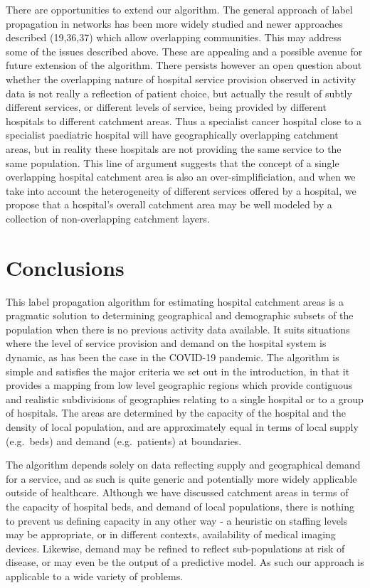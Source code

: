 \documentclass[
]{article}
\begin{document}
There are opportunities to extend our algorithm. The general approach of
label propagation in networks has been more widely studied and newer
approaches described (19,36,37) which allow overlapping communities.
This may address some of the issues described above. These are appealing
and a possible avenue for future extension of the algorithm. There
persists however an open question about whether the overlapping nature
of hospital service provision observed in activity data is not really a
reflection of patient choice, but actually the result of subtly
different services, or different levels of service, being provided by
different hospitals to different catchment areas. Thus a specialist
cancer hospital close to a specialist paediatric hospital will have
geographically overlapping catchment areas, but in reality these
hospitals are not providing the same service to the same population.
This line of argument suggests that the concept of a single overlapping
hospital catchment area is also an over-simplificiation, and when we
take into account the heterogeneity of different services offered by a
hospital, we propose that a hospital's overall catchment area may be
well modeled by a collection of non-overlapping catchment layers.

\hypertarget{conclusions}{%
\section{Conclusions}\label{conclusions}}

This label propagation algorithm for estimating hospital catchment areas
is a pragmatic solution to determining geographical and demographic
subsets of the population when there is no previous activity data
available. It suits situations where the level of service provision and
demand on the hospital system is dynamic, as has been the case in the
COVID-19 pandemic. The algorithm is simple and satisfies the major
criteria we set out in the introduction, in that it provides a mapping
from low level geographic regions which provide contiguous and realistic
subdivisions of geographies relating to a single hospital or to a group
of hospitals. The areas are determined by the capacity of the hospital
and the density of local population, and are approximately equal in
terms of local supply (e.g.~beds) and demand (e.g.~patients) at
boundaries.

The algorithm depends solely on data reflecting supply and geographical
demand for a service, and as such is quite generic and potentially more
widely applicable outside of healthcare. Although we have discussed
catchment areas in terms of the capacity of hospital beds, and demand of
local populations, there is nothing to prevent us defining capacity in
any other way - a heuristic on staffing levels may be appropriate, or in
different contexts, availability of medical imaging devices. Likewise,
demand may be refined to reflect sub-populations at risk of disease, or
may even be the output of a predictive model. As such our approach is
applicable to a wide variety of problems.
\end{document}

